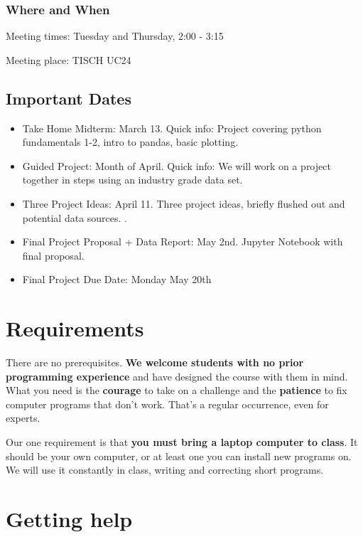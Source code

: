 \subsubsection*{Where and When}
Meeting times: Tuesday and Thursday, 2:00 - 3:15

Meeting place: TISCH UC24

\subsection*{Important Dates}

\begin{itemize}

\item Take Home Midterm: March 13. Quick info: Project covering python fundamentals 1-2, intro to pandas, basic plotting.

\item Guided Project: Month of April. Quick info: We will work on a project together in steps using an industry grade data set.

\item Three Project Ideas: April 11. Three project ideas, briefly flushed out and potential data sources. .

\item Final Project Proposal + Data Report: May 2nd. Jupyter Notebook with final proposal.

\item Final Project Due Date: Monday May 20th

\end{itemize}

\section*{Requirements}

There are no prerequisites.
{\bf We welcome students with no prior programming experience\/}
and have designed the course with them in mind.
What you need is the {\bf courage\/} to take on a challenge
and the {\bf patience\/} to fix computer programs that don't work.
That's a regular occurrence, even for experts.

Our one requirement is that {\bf you must bring a laptop computer to class\/}.
It should be your own computer, or at least one you can install new programs on.
We will use it constantly in class, writing and correcting short programs.


\section*{Getting help}

